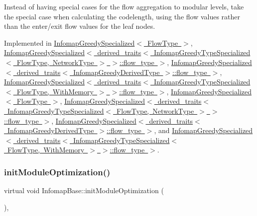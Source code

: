 Instead of having special cases for the flow aggregation to modular levels, take the special case when calculating the codelength, using the flow values rather than the enter/exit flow values for the leaf nodes. 

Implemented in \mbox{\hyperlink{classInfomapGreedySpecialized_a8a43bd2e0610fb4e5a9375f1c36202ec}{Infomap\+Greedy\+Specialized$<$ Flow\+Type $>$}}, \mbox{\hyperlink{classInfomapGreedySpecialized_a8a43bd2e0610fb4e5a9375f1c36202ec}{Infomap\+Greedy\+Specialized$<$ derived\+\_\+traits$<$ Infomap\+Greedy\+Type\+Specialized$<$ Flow\+Type, Network\+Type $>$ $>$\+::flow\+\_\+type $>$}}, \mbox{\hyperlink{classInfomapGreedySpecialized_a8a43bd2e0610fb4e5a9375f1c36202ec}{Infomap\+Greedy\+Specialized$<$ derived\+\_\+traits$<$ Infomap\+Greedy\+Derived\+Type $>$\+::flow\+\_\+type $>$}}, \mbox{\hyperlink{classInfomapGreedySpecialized_a8a43bd2e0610fb4e5a9375f1c36202ec}{Infomap\+Greedy\+Specialized$<$ derived\+\_\+traits$<$ Infomap\+Greedy\+Type\+Specialized$<$ Flow\+Type, With\+Memory $>$ $>$\+::flow\+\_\+type $>$}}, \mbox{\hyperlink{classInfomapGreedySpecialized_ab1ccbef79b7e94cf2762aa5a94a28965}{Infomap\+Greedy\+Specialized$<$ Flow\+Type $>$}}, \mbox{\hyperlink{classInfomapGreedySpecialized_ab1ccbef79b7e94cf2762aa5a94a28965}{Infomap\+Greedy\+Specialized$<$ derived\+\_\+traits$<$ Infomap\+Greedy\+Type\+Specialized$<$ Flow\+Type, Network\+Type $>$ $>$\+::flow\+\_\+type $>$}}, \mbox{\hyperlink{classInfomapGreedySpecialized_ab1ccbef79b7e94cf2762aa5a94a28965}{Infomap\+Greedy\+Specialized$<$ derived\+\_\+traits$<$ Infomap\+Greedy\+Derived\+Type $>$\+::flow\+\_\+type $>$}}, and \mbox{\hyperlink{classInfomapGreedySpecialized_ab1ccbef79b7e94cf2762aa5a94a28965}{Infomap\+Greedy\+Specialized$<$ derived\+\_\+traits$<$ Infomap\+Greedy\+Type\+Specialized$<$ Flow\+Type, With\+Memory $>$ $>$\+::flow\+\_\+type $>$}}.

\mbox{\label{classInfomapBase_a8347fea5ed1cd22a27c7d972496e7d90}} 
\subsubsection{\texorpdfstring{init\+Module\+Optimization()}{initModuleOptimization()}}
{\footnotesize\ttfamily virtual void Infomap\+Base\+::init\+Module\+Optimization (\begin{DoxyParamCaption}{ }\end{DoxyParamCaption})\hspace{0.3cm}{\ttfamily [protected]}, {}}

